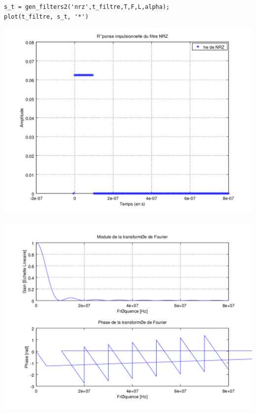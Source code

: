 \documentclass{acm_proc_article-sp}
\begin{document}
\begin{lstlisting}
s_t = gen_filters2('nrz',t_filtre,T,F,L,alpha);
plot(t_filtre, s_t, '*')
\end{lstlisting}

\begin{center}
\includegraphics[scale=0.45]{NRZ_3.png}
\end{center}

\begin{center}
\includegraphics[scale=0.45]{NRZ_rep_3.png}
\end{center}
\end{document}
